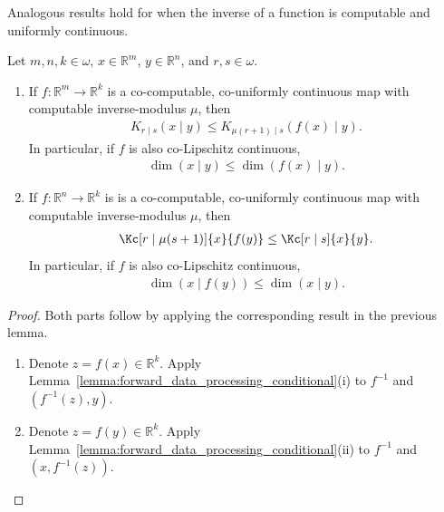 Analogous results hold for when the inverse of a function is computable and uniformly continuous.

\begin{lemma}
    \label{lemma:reverse_data_processing_conditional}
    Let $m, n, k \in \omega$, $x \in \mathbb{R}^m$, $y \in \mathbb{R}^n$, and $r, s \in \omega$.
    \begin{enumerate}[label = (\roman*)]
        \item If $f: \mathbb{R}^m \to \mathbb{R}^k$ is a co-computable, co-uniformly continuous map with computable inverse-modulus $\mu$, then
        \begin{align*}
            K_{r \mid s}(x \mid y) \leq K_{\mu(r + 1) \mid s}(f(x) \mid y).
        \end{align*}
        In particular, if $f$ is also co-Lipschitz continuous,
        \begin{align*}
            \dim(x \mid y) \leq \dim(f(x) \mid y).
        \end{align*}
        \item If $f: \mathbb{R}^n \to \mathbb{R}^k$ is is a co-computable, co-uniformly continuous map with computable inverse-modulus $\mu$, then
        \begin{align*}
             \Kc[r \mid \mu(s + 1)]{x}{f(y)} \leq \Kc[r \mid s]{x}{y}.
        \end{align*}
        In particular, if $f$ is also co-Lipschitz continuous,
        \begin{align*}
            \dim(x \mid f(y)) \leq \dim(x \mid y).
        \end{align*}
    \end{enumerate}
\end{lemma}
\begin{proof}
    Both parts follow by applying the corresponding result in the previous lemma. 
    \begin{enumerate}[label = (\roman*)]
        \item Denote $z = f(x) \in \mathbb{R}^k$. Apply Lemma~\ref{lemma:forward_data_processing_conditional}(i) to $f^{-1}$ and $(f^{-1}(z), y)$. 
        \item Denote $z = f(y) \in \mathbb{R}^k$. Apply Lemma~\ref{lemma:forward_data_processing_conditional}(ii) to $f^{-1}$ and $(x, f^{-1}(z))$.
    \end{enumerate}
\end{proof}

